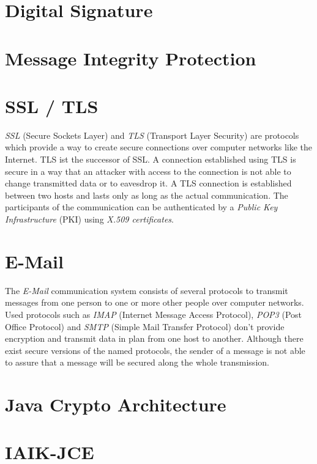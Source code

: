 
\section{Digital Signature}


\section{Message Integrity Protection}

\section{SSL / TLS}

\textit{SSL} (Secure Sockets Layer) and \textit{TLS} (Transport Layer Security) are protocols which provide a way to create secure connections over computer networks like the Internet.  TLS ist the successor of SSL. A connection established using TLS is secure in a way that an attacker with access to the connection is not able to change transmitted data or to eavesdrop it. \cite{RFC5246} A TLS connection is established between two hosts and lasts only as long as the actual communication. The participants of the communication can be authenticated by a \textit{Public Key Infrastructure} (PKI) using \textit{X.509 certificates}.

\section{E-Mail}

The \textit{E-Mail} communication system consists of several protocols to transmit messages from one person to one or more other people over computer networks. Used protocols such as \textit{IMAP} (Internet Message Access Protocol), \textit{POP3} (Post Office Protocol) and \textit{SMTP} (Simple Mail Transfer Protocol) don't provide encryption and transmit data in plan from one host to another. Although there exist secure versions of the named protocols, the sender of a message is not able to assure that a message will be secured along the whole transmission.  

\section{Java Crypto Architecture} \label{section:pre:jca}


\section{IAIK-JCE} \label{section:pre:jce}





